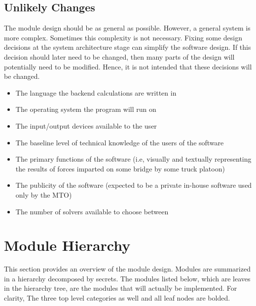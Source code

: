 \documentclass[12pt, titlepage]{article}
\begin{document}
\subsection{Unlikely Changes} \label{SecUchange}

The module design should be as general as possible. However, a general system is
more complex. Sometimes this complexity is not necessary. Fixing some design
decisions at the system architecture stage can simplify the software design. If
this decision should later need to be changed, then many parts of the design
will potentially need to be modified. Hence, it is not intended that these
decisions will be changed.

\begin{itemize}
    \item The language the backend calculations are written in
    \item The operating system the program will run on
    \item The input/output devices available to the user
    \item The baseline level of technical knowledge of the users of the software
    \item The primary functions of the software (i.e, visually and textually representing the results of forces imparted on some bridge by some truck platoon)
    \item The publicity of the software (expected to be a private in-house software used only by the MTO)
    \item The number of solvers available to choose between
\end{itemize}

\section{Module Hierarchy} \label{SecMH}

This section provides an overview of the module design. Modules are summarized
in a hierarchy decomposed by secrets. The modules listed
below, which are leaves in the hierarchy tree, are the modules that will
actually be implemented. For clarity, The three top level categories as well and all leaf nodes are bolded.
\end{document}
